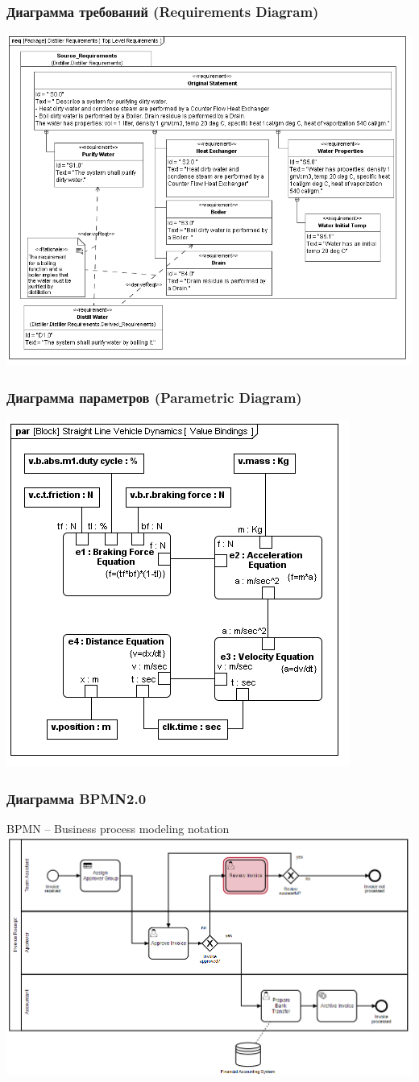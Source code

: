 \documentclass[10pt]{beamer}
\begin{document}
\begin{frame}
  \frametitle{Диаграмма требований (Requirements Diagram)}
  \centering
    \includegraphics[width=0.9\linewidth]{qms-pics/req-ex.png}
\end{frame}
\begin{frame}
  \frametitle{Диаграмма параметров (Parametric Diagram)}
  \centering
    \includegraphics[width=0.7\linewidth]{qms-pics/par-ex.png}
\end{frame}
\begin{frame}
  \frametitle{Диаграмма BPMN2.0}
  BPMN -- Business process modeling notation
  \centering
    \includegraphics[width=1\linewidth]{qms-pics/bpmn.png}
\end{frame}
\end{document}
